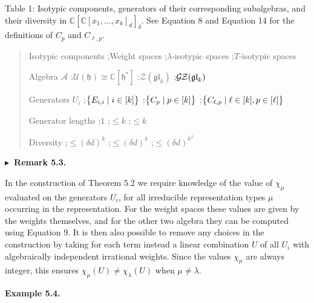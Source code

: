 Table 1: 
Isotypic components, generators of their corresponding subalgebras, and their diversity in $\mathbb{C}[\mathbb{C}[x_{1},\ldots,x_{k}]_{d}]_{\delta}$.
See Equation 8 and Equation 14 for the definitions of $C_{p}$ and $C_{\ell,p}$.


\begin{quote}
Isotypic components \quad;\quad Weight spaces \quad;\quad $\lambda$-isotypic spaces \quad;\quad $T$-isotypic spaces\par
Algebra $\mathcal{A}$ \quad;\quad $\mathcal{U}(\mathfrak{h})\cong\mathbb{C}[\mathfrak{h}^{*}]$ \quad;\quad $\mathcal{Z}(\mathfrak{gl}_{k})$ \quad;\quad $\mathcal{G}\hskip-1.00006pt\mathcal{Z}(\mathfrak{gl}_{k})$\par
Generators $U_{i}$ \quad;\quad $\big{\{}E_{i,i}\mid i\in[k]\big{\}}$ \quad;\quad $\big{\{}C_{p}\mid p\in[k]\big{\}}$ \quad;\quad $\big{\{}C_{\ell,p}\mid\ell\in[k],p\in[\ell]\big{\}}$\par
Generator lengths \quad;\quad $1$ \quad;\quad $\leq k$ \quad;\quad $\leq k$\par
Diversity \quad;\quad $\leq(\delta d)^{k}$ \quad;\quad $\leq(\delta d)^{k}$ \quad;\quad $\leq(\delta d)^{k^{2}}$\par
\end{quote}




\par\medskip\noindent\textbf{$\blacktriangleright$ Remark 5.3.}\par



In the construction of Theorem 5.2 we require knowledge of the value of $\chi_{\mu}$ evaluated on the generators $U_{i}$, for all irreducible representation types $\mu$ occurring in the representation.
For the weight spaces these values are given by the weights themselves, and for the other two algebra they can be computed using Equation 9.
It is then also possible to remove any choices in the construction by taking for each term instead a linear combination $U$ of all $U_{i}$ with algebraically independent irrational weights.
Since the values $\chi_{\mu}$ are always integer, this ensures $\chi_{\mu}(U)\neq\chi_{\lambda}(U)$ when $\mu\neq\lambda$.






\par\medskip\noindent\textbf{Example 5.4.}\par



